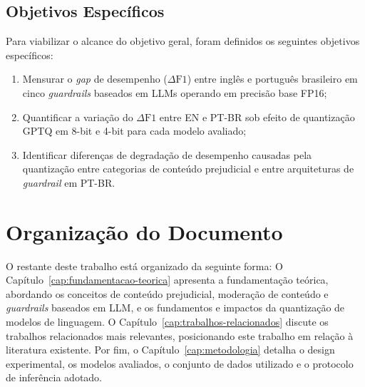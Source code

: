 \subsection{Objetivos Específicos}
\label{sec:objetivos-especificos}
Para viabilizar o alcance do objetivo geral, foram definidos os seguintes objetivos específicos:
\begin{enumerate}
	\item Mensurar o \textit{gap} de desempenho ($\Delta\text{F1}$) entre inglês e português brasileiro em cinco \textit{guardrails} baseados em LLMs operando em precisão base FP16;
	\item Quantificar a variação do $\Delta\text{F1}$ entre EN e PT-BR sob efeito de quantização GPTQ em 8-bit e 4-bit para cada modelo avaliado;
	\item Identificar diferenças de degradação de desempenho causadas pela quantização entre categorias de conteúdo prejudicial e entre arquiteturas de \textit{guardrail} em PT-BR.
\end{enumerate}

\section{Organização do Documento}
\label{sec:organizacao}
O restante deste trabalho está organizado da seguinte forma: O Capítulo~\ref{cap:fundamentacao-teorica} apresenta a fundamentação teórica, abordando os conceitos de conteúdo prejudicial, moderação de conteúdo e \textit{guardrails} baseados em LLM, e os fundamentos e impactos da quantização de modelos de linguagem. O Capítulo~\ref{cap:trabalhos-relacionados} discute os trabalhos relacionados mais relevantes, posicionando este trabalho em relação à literatura existente. Por fim, o Capítulo~\ref{cap:metodologia} detalha o design experimental, os modelos avaliados, o conjunto de dados utilizado e o protocolo de inferência adotado. %